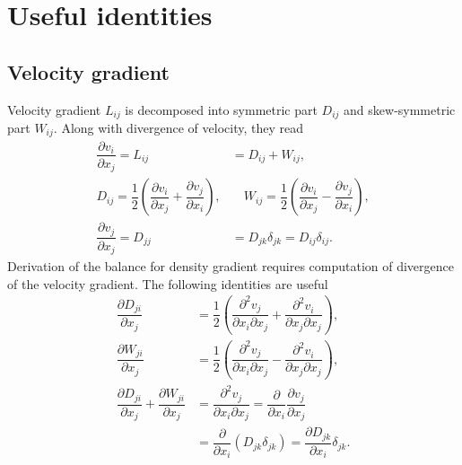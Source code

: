 \documentclass[a4paper,fleqn]{cas-sc}
\theoremstyle{definition}
\begin{document}
\appendix 


\section{Useful identities} 

\subsection{Velocity gradient} 

Velocity gradient $L_{ij}$ is decomposed into symmetric part $D_{ij}$ and skew-symmetric part $W_{ij}$. Along with divergence of velocity, they read  
\begin{align} \label{App:Lij} 
	\dfrac{\partial v_i}{\partial x_j} = L_{ij} & = D_{ij} + W_{ij},
	\nonumber \\ 
	D_{ij} = \dfrac{1}{2}\left(\dfrac{\partial v_i}{\partial x_j} 
	+ \dfrac{\partial v_j}{\partial x_i}\right), & \quad
	W_{ij} = \dfrac{1}{2}\left(\dfrac{\partial v_i}{\partial x_j} 
	- \dfrac{\partial v_j}{\partial x_i}\right), 
	\\ 
	\dfrac{\partial v_j}{\partial x_j} = D_{jj} & = D_{jk}\delta_{jk} = D_{ij}\delta_{ij}. 
	\nonumber 
\end{align}
Derivation of the balance for density gradient requires computation of divergence of the velocity gradient. The following identities are useful 
\begin{align} \label{App:divergenceLij}
	\dfrac{\partial D_{ji}}{\partial x_j} 
	& = \dfrac{1}{2}\left(\dfrac{\partial^2 v_j}{\partial x_i\partial x_j} + 
	\dfrac{\partial^2 v_i}{\partial x_j\partial x_j}\right), 
	\nonumber \\
	\dfrac{\partial W_{ji}}{\partial x_j} 
	& = \dfrac{1}{2}\left(\dfrac{\partial^2 v_j}{\partial x_i\partial x_j} 
	- \dfrac{\partial^2 v_i}{\partial x_j\partial x_j}\right),
	\\ 
	\dfrac{\partial D_{ji}}{\partial x_j} + \dfrac{\partial W_{ji}}{\partial x_j} 
	& = \dfrac{\partial^2 v_j}{\partial x_i \partial x_j} 
	= \dfrac{\partial}{\partial x_i}\dfrac{\partial v_j}{\partial x_j} 
	\nonumber \\
	& = \dfrac{\partial}{\partial x_i}(D_{jk}\delta_{jk}) 
	= \dfrac{\partial D_{jk}}{\partial x_i}\delta_{jk}. 
	\nonumber 
\end{align}
\end{document}

